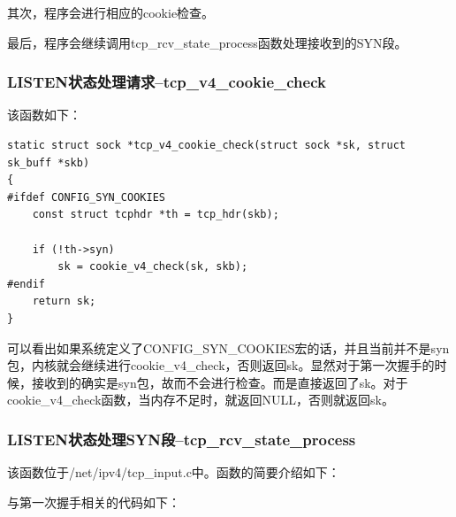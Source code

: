                 其次，程序会进行相应的cookie检查。

                最后，程序会继续调用tcp\_rcv\_state\_process函数处理接收到的SYN段。
            
    \subsubsection{LISTEN状态处理请求--tcp\_v4\_cookie\_check}
                该函数如下：
\begin{verbatim}
static struct sock *tcp_v4_cookie_check(struct sock *sk, struct sk_buff *skb)
{
#ifdef CONFIG_SYN_COOKIES
    const struct tcphdr *th = tcp_hdr(skb);

    if (!th->syn)
        sk = cookie_v4_check(sk, skb);
#endif
    return sk;
}
\end{verbatim}

                可以看出如果系统定义了CONFIG\_SYN\_COOKIES宏的话，并且当前并不是syn包，内核就会继续进行cookie\_v4\_check，否则返回sk。显然对于第一次握手的时候，接收到的确实是syn包，故而不会进行检查。而是直接返回了sk。对于cookie\_v4\_check函数，当内存不足时，就返回NULL，否则就返回sk。
            \subsubsection{LISTEN状态处理SYN段--tcp\_rcv\_state\_process}
                该函数位于/net/ipv4/tcp\_input.c中。函数的简要介绍如下：

                与第一次握手相关的代码如下：

